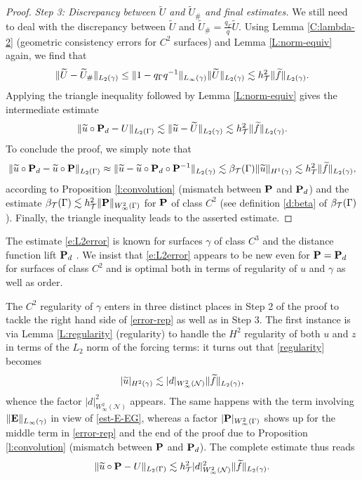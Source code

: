 \begin{proof}
\smallskip\noindent
{\it Step 3: Discrepancy between $\widetilde{U}$ and $\widetilde{U}_\#$ and final estimates.}  We still need to deal with the discrepancy between $\widetilde{U}$ and $\widetilde{U}_\#=\frac{q_\Gamma}{q} \widetilde{U}$.  Using Lemma \ref{C:lambda-2} (geometric consistency errors for $C^2$ surfaces) and Lemma \ref{L:norm-equiv} again, we find that
\[ \|\widetilde{U} -\widetilde{U}_\#\|_{L_2(\gamma)} \le \|1-q_\Gamma q^{-1}\|_{L_\infty(\gamma)} \|\widetilde{U}\|_{L_2(\gamma)} \lesssim h_{\mathcal{T}}^2 \|\widetilde{f}\|_{L_2(\gamma)}.\]
%
Applying the triangle inequality followed by Lemma \ref{L:norm-equiv}
gives the intermediate estimate
%
\[
\| \widetilde{u}\circ{\bf P}_d - U \|_{L_2(\Gamma)} \lesssim \| \widetilde{u} - \widetilde U \|_{L_2(\gamma)} \lesssim
h_{\mathcal{T}}^2 \|\widetilde{f}\|_{L_2(\gamma)}.
\]
%
To conclude the proof, we simply note that
%
\[
\| \widetilde{u}\circ{\bf P}_d - \widetilde{u}\circ{\bf P} \|_{L_2(\Gamma)} \approx
\| \widetilde{u} - \widetilde{u}\circ{\bf P}_d\circ{\bf P}^{-1} \|_{L_2(\gamma)} \lesssim
\beta_{\mathcal{T}}(\Gamma) \|\widetilde{u}\|_{H^1(\gamma)} \lesssim h_T^2 \|\widetilde{f}\|_{L_2(\gamma)},
\]
%
according to Proposition \ref{l:convolution} (mismatch between ${\bf P}$ and ${\bf P}_d$)
and the estimate $\beta_{\mathcal{T}}(\Gamma)\lesssim h_{\mathcal{T}}^2 \|{\bf P}\|_{W^2_\infty(\Gamma)}$
for ${\bf P}$ of class $C^2$ (see definition \eqref{d:beta} of $\beta_{\mathcal{T}}(\Gamma)$).
Finally, the triangle inequality leads to the asserted estimate.
\end{proof}

The estimate \eqref{e:L2error} is known for surfaces $\gamma$ of class $C^3$ and
the distance function lift ${\bf P}_d$ \cite{Dz88}.
We insist that \eqref{e:L2error} appears to
be new even for ${\bf P}={\bf P}_d$ for surfaces of class $C^2$ and is optimal both in
terms of regularity of $u$ and $\gamma$ as well as order.

The $C^2$ regularity of $\gamma$ enters in three distinct places in Step 2
of the proof to tackle the right hand side of \eqref{error-rep}
as well as in Step 3. The first instance is via Lemma \ref{L:regularity}
(regularity) to handle the $H^2$ regularity of both $u$ and $z$ in terms of the
$L_2$ norm of the forcing terms: it turns out that \eqref{regularity} becomes
%
\[
|\widetilde{u}|_{H^2(\gamma)} \lesssim |d|_{W^2_\infty(\mathcal{N})} \|\widetilde{f}\|_{L_2(\gamma)},
\]
%
whence the factor $|d|_{W^2_\infty(\mathcal{N})}^2$ appears. The same happens with the
term involving $\|{\bf E}\|_{L_\infty(\gamma)}$ in view of \eqref{est-E-EG}, whereas
a factor $|{\bf P}|_{W^2_\infty(\Gamma)}$ shows up for the middle term in \eqref{error-rep}
and the end of the proof due to Proposition \ref{l:convolution} (mismatch
between ${\bf P}$ and ${\bf P}_d$). The complete estimate thus reads
%
\begin{equation}\label{complete-est}
  \|\widetilde{u}\circ{\bf P} - U\|_{L_2(\Gamma)} \lesssim
  h_{\mathcal{T}}^2 |d|_{W^2_\infty(\mathcal{N})}^2 \|\widetilde{f}\|_{L_2(\gamma)}.
\end{equation}
%

